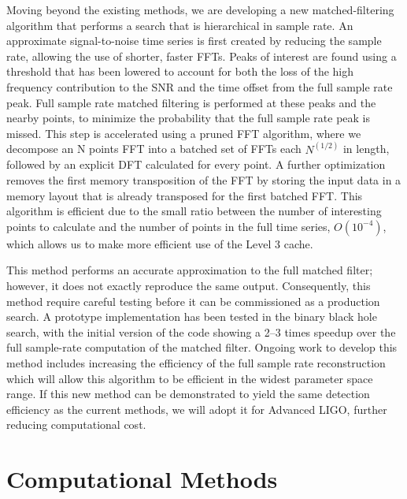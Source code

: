Moving beyond the existing methods, we are developing a new
matched-filtering algorithm that performs a search that is hierarchical in
sample rate.  An approximate signal-to-noise time series is first created by
reducing the sample rate, allowing the use of shorter, faster FFTs. Peaks of
interest are found using a threshold that has been lowered to account for both
the loss of the high frequency contribution to the SNR and the time offset
from the full sample rate peak.  Full sample rate matched filtering is
performed at these peaks and the nearby points, to minimize the probability
that the full sample rate peak is missed.  This step is accelerated using a
pruned FFT algorithm, where we decompose an N points FFT into a batched set of
FFTs  each $N^{(1/2)}$ in length, followed by an explicit DFT calculated for
every point. A further optimization removes the first memory transposition of
the FFT by storing the input data in a memory layout that is already
transposed for the first batched FFT. This algorithm is efficient due to the
small ratio between the number of interesting points to calculate and the number of points in
the full time series, $O(10^{-4})$, which allows us to make more efficient use
of the Level 3 cache.

This method performs an accurate approximation to the full matched filter;
however, it does not exactly reproduce the same output. Consequently, this
method require careful testing before it can be commissioned as a production
search. %
A prototype implementation has been tested in the binary black
hole search, with the initial version of the code showing a 2--3 times speedup over the full
sample-rate computation of the matched filter. Ongoing work to develop this
method includes
increasing the efficiency of the full sample rate reconstruction which will
allow this algorithm to be efficient in the widest parameter space range. If
this new method can be demonstrated to yield the same detection efficiency as
the current methods, we will adopt it for Advanced LIGO, further reducing
computational cost.


\vspace*{-10pt}
\section{Computational Methods}
\vspace*{-5pt}
\label{sec:CompMethod}

